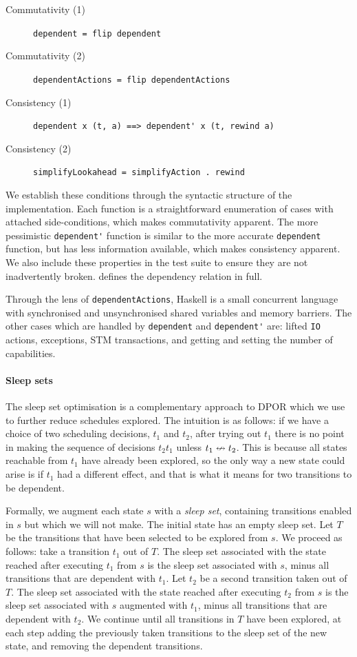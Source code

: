 \begin{description}
\item[Commutativity (1)]
  \verb|dependent = flip dependent|
\item[Commutativity (2)]
  \verb|dependentActions = flip dependentActions|
\item[Consistency (1)]
  \verb|dependent x (t, a) ==> dependent' x (t, rewind a)|
\item[Consistency (2)]
  \verb|simplifyLookahead = simplifyAction . rewind|
\end{description}

We establish these conditions through the syntactic structure of the
implementation.  Each function is a straightforward enumeration of
cases with attached side-conditions, which makes commutativity
apparent.  The more pessimistic \verb|dependent'| function is similar
to the more accurate \verb|dependent| function, but has less
information available, which makes consistency apparent.  We also
include these properties in the \dejafu{} test suite to ensure they
are not inadvertently broken.   defines the
dependency relation in full.

Through the lens of \verb|dependentActions|, Haskell is a small
concurrent language with synchronised and unsynchronised shared
variables and memory barriers.  The other cases which are handled by
\verb|dependent| and \verb|dependent'| are: lifted \verb|IO| actions,
exceptions, STM transactions, and getting and setting the number of
capabilities.

\paragraph{Sleep sets}
The sleep set optimisation\cite{godefroid1996} is a complementary
approach to DPOR which we use to further reduce schedules explored.
The intuition is as follows: if we have a choice of two scheduling
decisions, $t_{1}$ and $t_{2}$, after trying out $t_{1}$ there is no
point in making the sequence of decisions $t_{2}t_{1}$ unless
$t_{1} \nleftrightarrow t_{2}$.  This is because all states reachable from
$t_{1}$ have already been explored, so the only way a new state could
arise is if $t_{1}$ had a different effect, and that is what it means
for two transitions to be dependent.

Formally, we augment each state $s$ with a \emph{sleep set},
containing transitions enabled in $s$ but which we will not make.  The
initial state has an empty sleep set.  Let $T$ be the transitions that
have been selected to be explored from $s$.  We proceed as follows:
take a transition $t_{1}$ out of $T$.  The sleep set associated with
the state reached after executing $t_{1}$ from $s$ is the sleep set
associated with $s$, minus all transitions that are dependent with
$t_{1}$.  Let $t_{2}$ be a second transition taken out of $T$.  The
sleep set associated with the state reached after executing $t_{2}$
from $s$ is the sleep set associated with $s$ augmented with $t_{1}$,
minus all transitions that are dependent with $t_{2}$.  We continue
until all transitions in $T$ have been explored, at each step adding
the previously taken transitions to the sleep set of the new state,
and removing the dependent transitions.


